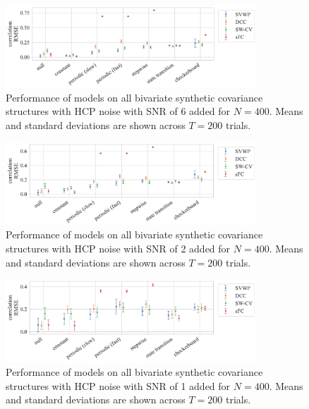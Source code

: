 \begin{figure}[ht]
  \centering
  \includegraphics[width=0.84\textwidth]{fig/sim/d2/N0400_T0200/HCP_noise_snr_6/correlation_RMSE}
  \caption{
    Performance of models on all bivariate synthetic covariance structures with HCP noise with SNR of 6 added for $N = 400$.
    Means and standard deviations are shown across $T = 200$ trials.
  }\label{fig:results-sim-d2-400-all-correlation-RMSE-snr-6}
\end{figure}


\begin{figure}[ht]
  \centering
  \includegraphics[width=0.84\textwidth]{fig/sim/d2/N0400_T0200/HCP_noise_snr_2/correlation_RMSE}
  \caption{
    Performance of models on all bivariate synthetic covariance structures with HCP noise with SNR of 2 added for $N = 400$.
    Means and standard deviations are shown across $T = 200$ trials.
  }\label{fig:results-sim-d2-400-all-correlation-RMSE-snr-2}
\end{figure}


\begin{figure}[ht]
  \centering
  \includegraphics[width=0.84\textwidth]{fig/sim/d2/N0400_T0200/HCP_noise_snr_1/correlation_RMSE}
  \caption{
    Performance of models on all bivariate synthetic covariance structures with HCP noise with SNR of 1 added for $N = 400$.
    Means and standard deviations are shown across $T = 200$ trials.
  }\label{fig:results-sim-d2-400-all-correlation-RMSE-snr-1}
\end{figure}


